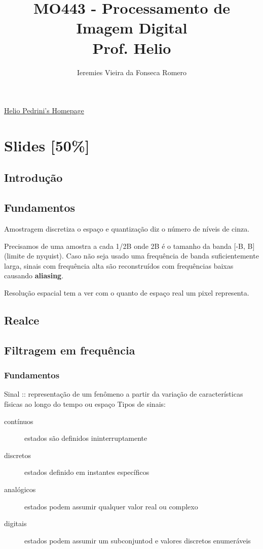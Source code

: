 \documentclass[twocolumn, 10pt]{article}
\author{Ieremies Vieira da Fonseca Romero}
\date{}
\title{MO443 - Processamento de Imagem Digital\\\medskip
\large Prof. Helio}
\begin{document}
\maketitle
\href{https://www.ic.unicamp.br/\~helio/}{Helio Pedrini's Homepage}

\section*{Slides [50\%]}
\label{sec:org7cdfdbc}
\subsection*{Introdução}
\label{sec:org0680d5a}
\subsection*{Fundamentos}
\label{sec:org06fa83f}
Amostragem discretiza o espaço e quantização diz o número de níveis de cinza.

Precisamos de uma amostra a cada 1/2B onde 2B é o tamanho da banda [-B, B] (limite de nyquist).
Caso não seja usado uma frequência de banda suficientemente larga, sinais com frequência alta são reconstruídos com frequências baixas causando \textbf{aliasing}.

Resolução espacial tem a ver com o quanto de espaço real um pixel representa.
\subsection*{Realce}
\label{sec:org82cfe64}
\subsection*{Filtragem em frequência}
\label{sec:orge4f8abe}
\subsubsection*{Fundamentos}
\label{sec:orge46044c}
Sinal :: representação de um fenômeno a partir da variação de características físicas ao longo do tempo ou espaço
Tipos de sinais:
\begin{description}
\item[{contínuos}] estados são definidos ininterruptamente
\item[{discretos}] estados definido em instantes específicos
\item[{analógicos}] estados podem assumir qualquer valor real ou complexo
\item[{digitais}] estados podem assumir um subconjuntod e valores discretos enumeráveis
\end{description}
\end{document}
